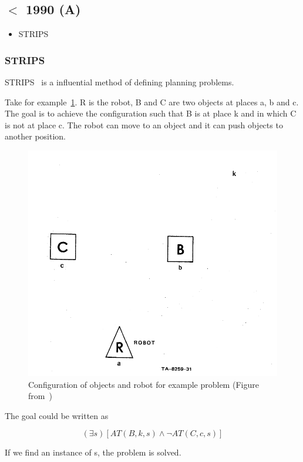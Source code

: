 \documentclass[runningheads,a4paper]{llncs}
\begin{document}
\subsection{$<$ 1990 (A)}

\begin{itemize}
	\item STRIPS \cite{fikes1971strips}
\end{itemize}

\subsubsection{STRIPS}

STRIPS~\cite{fikes1971strips} is a influential method of defining planning
problems.

Take for example~\ref{fig:strips}. R is the robot, B and C are two objects at
places a, b and c. The goal is to achieve the configuration such that B is at
place k and in which C is not at place c. The robot can move to an object and
it can push objects to another position.

\begin{figure}[htb]%
\includegraphics[width=0.8\columnwidth]{strips-example.pdf}%
\caption{Configuration of objects and robot for example problem (Figure from~\cite{fikes1971strips})}%
\label{fig:strips}%
\end{figure}

The goal could be written as

\[(\exists s) [ AT(B,k,s) \land \neg AT(C,c,s) ]\]

If we find an instance of s, the problem is solved.
\end{document}
